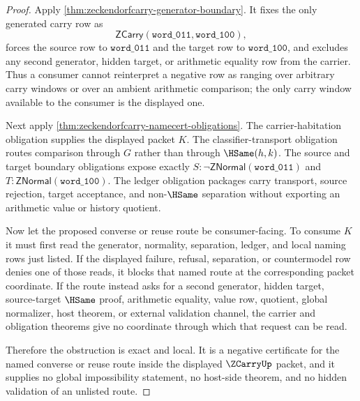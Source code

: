 \begin{proof}
Apply \autoref{thm:zeckendorfcarry-generator-boundary}. It fixes the only generated carry row as
$$
\mathsf{ZCarry}(\mathtt{word\_011},\mathtt{word\_100}),
$$
forces the source row to $\mathtt{word\_011}$ and the target row to $\mathtt{word\_100}$, and excludes any second generator, hidden target, or arithmetic equality row from the carrier. Thus a consumer cannot reinterpret a negative row as ranging over arbitrary carry windows or over an ambient arithmetic comparison; the only carry window available to the consumer is the displayed one.

Next apply \autoref{thm:zeckendorfcarry-namecert-obligations}. The carrier-habitation obligation supplies the displayed packet $K$. The classifier-transport obligation routes comparison through $G$ rather than through $\HSame(h,k)$. The source and target boundary obligations expose exactly $S:\neg\mathsf{ZNormal}(\mathtt{word\_011})$ and $T:\mathsf{ZNormal}(\mathtt{word\_100})$. The ledger obligation packages carry transport, source rejection, target acceptance, and non-$\HSame$ separation without exporting an arithmetic value or history quotient.

Now let the proposed converse or reuse route be consumer-facing. To consume $K$ it must first read the generator, normality, separation, ledger, and local naming rows just listed. If the displayed failure, refusal, separation, or countermodel row denies one of those reads, it blocks that named route at the corresponding packet coordinate. If the route instead asks for a second generator, hidden target, source-target $\HSame$ proof, arithmetic equality, value row, quotient, global normalizer, host theorem, or external validation channel, the carrier and obligation theorems give no coordinate through which that request can be read.

Therefore the obstruction is exact and local. It is a negative certificate for the named converse or reuse route inside the displayed $\ZCarryUp$ packet, and it supplies no global impossibility statement, no host-side theorem, and no hidden validation of an unlisted route.
\end{proof}
